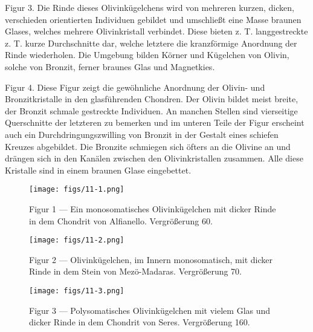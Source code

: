 \documentclass[a4paper, 12pt, oneside]{article}
\begin{document}
Figur 3. Die Rinde dieses Olivinkügelchens wird von mehreren kurzen, dicken, verschieden orientierten Individuen gebildet und umschließt eine Masse braunen Glases, welches mehrere Olivinkristall verbindet. Diese bieten z. T. langgestreckte z. T. kurze Durchschnitte dar, welche letztere die kranzförmige Anordnung der Rinde wiederholen. Die Umgebung bilden Körner und Kügelchen von Olivin, solche von Bronzit, ferner braunes Glas und Magnetkies.

Figur 4. Diese Figur zeigt die gewöhnliche Anordnung der Olivin- und Bronzitkristalle in den glasführenden Chondren. Der Olivin bildet meist breite, der Bronzit schmale gestreckte Individuen. An manchen Stellen sind vierseitige Querschnitte der letzteren zu bemerken und im unteren Teile der Figur erscheint auch ein Durchdringungszwilling von Bronzit in der Gestalt eines schiefen Kreuzes abgebildet. Die Bronzite schmiegen sich öfters an die Olivine an und drängen sich in den Kanälen zwischen den Olivinkristallen zusammen. Alle diese Kristalle sind in einem braunen Glase eingebettet.
\clearpage

\vspace*{\fill}
\begin{figure}[H]
\centering
\texttt{[image: figs/11-1.png]}
\caption{\small Figur 1 --- Ein monosomatisches Olivinkügelchen mit dicker Rinde in dem Chondrit von Alfianello. Vergrößerung 60.}
\end{figure}
\vspace*{\fill}
\clearpage

\vspace*{\fill}
\begin{figure}[H]
\centering
\texttt{[image: figs/11-2.png]}
\caption{\small Figur 2 --- Olivinkügelchen, im Innern monosomatisch, mit dicker Rinde in dem Stein von Mezö-Madaras. Vergrößerung 70.}
\end{figure}
\vspace*{\fill}
\clearpage

\vspace*{\fill}
\begin{figure}[H]
\centering
\texttt{[image: figs/11-3.png]}
\caption{\small Figur 3 --- Polysomatisches Olivinkügelchen mit vielem Glas und dicker Rinde in dem Chondrit von Seres. Vergrößerung 160.}
\end{figure}
\vspace*{\fill}
\clearpage
\end{document}

